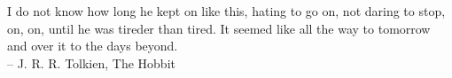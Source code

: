 \begin{starting_phrase}
	I do not know how long he kept on like this, hating to go on, not daring to stop, on, on, until he was tireder than tired. It seemed like all the way to tomorrow and over it to the days beyond.\\
	\flushright -- J. R. R. Tolkien, The Hobbit
\end{starting_phrase}